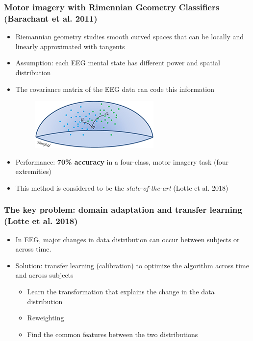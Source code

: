 \documentclass{beamer}
\begin{document}
\begin{frame}
	\frametitle{Motor imagery with Rimennian Geometry Classifiers (Barachant et al. 2011)}
	
	\begin{itemize}

		\item Riemannian geometry studies smooth curved spaces that can be locally and linearly approximated with tangents
		
		\item Assumption: each EEG mental state has different power and spatial distribution

		\item The covariance matrix of the EEG data can code this information
		\begin{figure}
			\centering
			\includegraphics[scale=1.0]{fig8.jpg}
		\end{figure}

		\item Performance: \textbf{70\% accuracy} in a four-class, motor imagery task (four extremities)

		\item This method is considered to be the \textit{state-of-the-art} (Lotte et al. 2018)

	\end{itemize}

\end{frame}

\begin{frame}
	\frametitle{The key problem: domain adaptation and transfer learning (Lotte et al. 2018)}
	
	\begin{itemize}

		\item In EEG, major changes in data distribution can occur between subjects or across time.

		\item Solution: transfer learning (calibration) to optimize the algorithm across time and across subjects

		\begin{itemize}
			\item Learn the transformation that explains the change in the data distribution
			\item Reweighting
			\item Find the common features between the two distributions
		\end{itemize}

	\end{itemize}

\end{frame}
\end{document}
